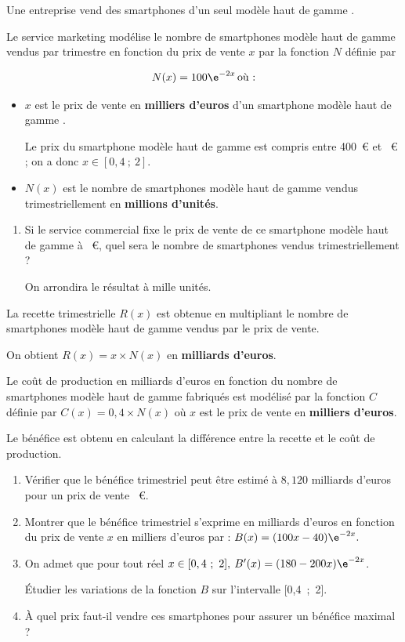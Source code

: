 \medskip

Une entreprise vend des smartphones d'un seul modèle \og haut de gamme \fg.

Le service marketing modélise le nombre de smartphones modèle \og haut de gamme\fg{}
vendus par trimestre en fonction du prix de vente $x$ par la fonction $N$ définie par 

\[N(x) = 100\e^{-2x}\,  \text{où :}\]


\setlength\parindent{1cm}
\begin{itemize}
\item $x$ est le prix de vente en \textbf{milliers d'euros} d'un smartphone modèle \og haut de gamme \fg.

 Le prix du smartphone modèle \og haut de gamme\fg{} est compris entre 400~\euro{} et ~\euro{} ; on a donc $x \in [0,4~;~2]$.
\item $N(x)$ est le nombre de smartphones modèle \og haut de gamme\fg{} vendus trimestriellement en \textbf{millions d'unités}.
\end{itemize}
\setlength\parindent{0cm}

\smallskip

\begin{enumerate}
\item Si le service commercial fixe le prix de vente de ce smartphone modèle \og haut de gamme\fg{} à ~\euro, quel sera le nombre de smartphones vendus trimestriellement ? 

On arrondira le résultat à mille unités.
\end{enumerate}

La recette trimestrielle $R(x)$ est obtenue en multipliant le nombre de smartphones modèle \og haut de gamme\fg{} vendus par le prix de vente. 

On obtient $R(x) = x \times  N(x)$ en \textbf{milliards d'euros}.

Le coût de production en milliards d'euros en fonction du nombre de smartphones modèle \og haut de gamme\fg{} fabriqués est modélisé par la fonction $C$ définie par $C(x) = 0,4 \times N(x)$ où $x$ est le prix de vente en \textbf{milliers d'euros}.

Le bénéfice est obtenu en calculant la différence entre la recette et le coût de production.

\smallskip

\begin{enumerate}[resume]
\item Vérifier que le bénéfice trimestriel peut être estimé à $8,120$ milliards d'euros pour un prix de vente ~\euro.
\item Montrer que le bénéfice trimestriel s'exprime en milliards d'euros en fonction du prix de vente $x$ en milliers d'euros par : $B(x) = (100x - 40) \e^{-2x}.$
\item On admet que pour tout réel $x \in  [0,4~;~2],\: B'(x) = (180 - 200x )\e^{-2x}$.

 Étudier les variations de la fonction $B$ sur l'intervalle [0,4~;~2].
\item À quel prix faut-il vendre ces smartphones pour assurer un bénéfice maximal ?
\end{enumerate}
